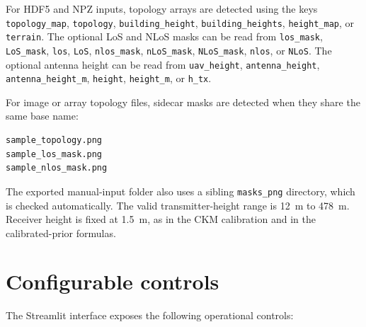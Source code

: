 For HDF5 and NPZ inputs, topology arrays are detected using the keys
\texttt{topology\_map}, \texttt{topology}, \texttt{building\_height},
\texttt{building\_heights}, \texttt{height\_map}, or \texttt{terrain}.
The optional LoS and NLoS masks can be read from \texttt{los\_mask},
\texttt{LoS\_mask}, \texttt{los}, \texttt{LoS}, \texttt{nlos\_mask},
\texttt{nLoS\_mask}, \texttt{NLoS\_mask}, \texttt{nlos}, or
\texttt{NLoS}. The optional antenna height can be read from
\texttt{uav\_height}, \texttt{antenna\_height},
\texttt{antenna\_height\_m}, \texttt{height}, \texttt{height\_m}, or
\texttt{h\_tx}.

For image or array topology files, sidecar masks are detected when they share
the same base name:

{\scriptsize
\begin{verbatim}
sample_topology.png
sample_los_mask.png
sample_nlos_mask.png
\end{verbatim}
}

The exported manual-input folder also uses a sibling \texttt{masks\_png}
directory, which is checked automatically. The valid transmitter-height range
is \SI{12}{m} to \SI{478}{m}. Receiver height is fixed at \SI{1.5}{m}, as in
the CKM calibration and in the calibrated-prior formulas.

\section{Configurable controls}

The Streamlit interface exposes the following operational controls:

